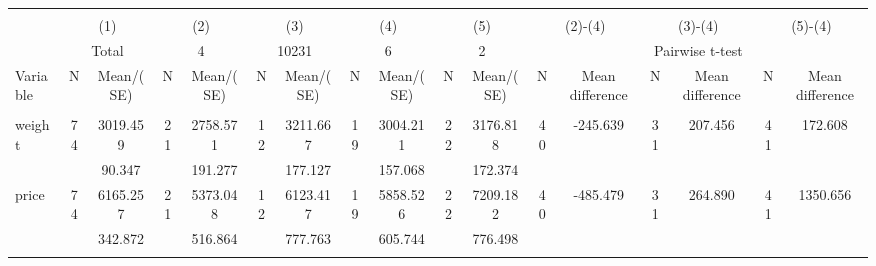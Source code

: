 
\begin{tabular}{@{\extracolsep{5pt}}lcccccccccccccccc}
\\[-1.8ex]\hline \hline \\[-1.8ex]
 & \multicolumn{2}{c}{(1)}  & \multicolumn{2}{c}{(2)}  & \multicolumn{2}{c}{(3)}  & \multicolumn{2}{c}{(4)}  & \multicolumn{2}{c}{(5)}  & \multicolumn{2}{c}{(2)-(4)} & \multicolumn{2}{c}{(3)-(4)} & \multicolumn{2}{c}{(5)-(4)} \\
 & \multicolumn{2}{c}{Total}  & \multicolumn{2}{c}{4}  & \multicolumn{2}{c}{10231}  & \multicolumn{2}{c}{6}  & \multicolumn{2}{c}{2}  & \multicolumn{6}{c}{Pairwise t-test}  \\
Variable & N & Mean/(SE) & N & Mean/(SE) & N & Mean/(SE) & N & Mean/(SE) & N & Mean/(SE) & N & Mean difference & N & Mean difference & N & Mean difference \\ \hline \\[-1.8ex] 
weight   & 74    &  3019.459    & 21    &  2758.571    & 12    &  3211.667    & 19    &  3004.211    & 22    &  3176.818    & 40    &  -245.639    & 31    &   207.456    & 41    &   172.608   \\
 &   &    90.347  &   &   191.277  &   &   177.127  &   &   157.068  &   &   172.374  &   &  &   &  &   &   \\
price   & 74    &  6165.257    & 21    &  5373.048    & 12    &  6123.417    & 19    &  5858.526    & 22    &  7209.182    & 40    &  -485.479    & 31    &   264.890    & 41    &  1350.656   \\
 &   &   342.872  &   &   516.864  &   &   777.763  &   &   605.744  &   &   776.498  &   &  &   &  &   &   \\
\hline \\[-1.8ex]

\end{tabular}
